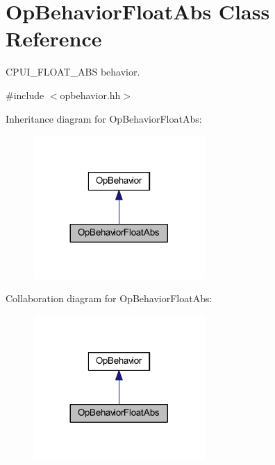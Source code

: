 \hypertarget{class_op_behavior_float_abs}{}\section{Op\+Behavior\+Float\+Abs Class Reference}
\label{class_op_behavior_float_abs}


C\+P\+U\+I\+\_\+\+F\+L\+O\+A\+T\+\_\+\+A\+BS behavior.  




{\ttfamily \#include $<$opbehavior.\+hh$>$}



Inheritance diagram for Op\+Behavior\+Float\+Abs\+:
\nopagebreak
\begin{figure}[H]
\begin{center}
\leavevmode
\includegraphics[width=185pt]{class_op_behavior_float_abs__inherit__graph}
\end{center}
\end{figure}


Collaboration diagram for Op\+Behavior\+Float\+Abs\+:
\nopagebreak
\begin{figure}[H]
\begin{center}
\leavevmode
\includegraphics[width=185pt]{class_op_behavior_float_abs__coll__graph}
\end{center}
\end{figure}
